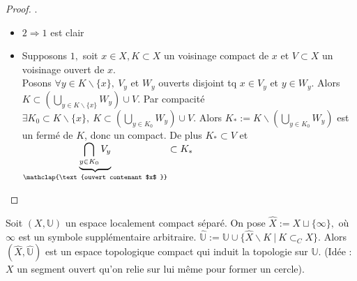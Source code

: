 \begin{proof}.
    \begin{itemize}
        \item $2\Rightarrow 1$ est clair
        \item Supposons $1,$ soit $x\in X,K\subset X$ un voisinage compact de $x$ et $V\subset X$ un voisinage ouvert de $x.$ \\
            Posons $\forall y\in K\backslash \{x\} ,\ V_y $ et $W_y$ ouverts disjoint tq $x\in V_y$ et $y\in W_y.$ Alors $K\subset \left( \bigcup\limits_{y\in K\backslash \{x\} }W_y  \right)\cup V $. Par compacité $\exists K_0\subset K\backslash \{x\} ,\ K\subset \left( \bigcup\limits_{y\in K_0} W_y \right) \cup V.$ Alors $K_*:=K\backslash \left( \bigcup\limits_{y\in K_0} W_y \right) $ est un fermé de $K$, donc un compact. De plus $K_*\subset V$ et $\underbrace{\bigcap\limits_{y\in K_0} V_y}_{\mathclap{\text{ouvert contenant $x$ }}}\subset K_*$
    \end{itemize}
\end{proof}
\begin{definition}
    Soit $(X,\mathbb{U})$ un espace localement compact séparé. On pose $\hat{X}:=X\sqcup \{\infty \} ,$ où $\infty $ est un symbole supplémentaire arbitraire. $\hat{\mathbb{U}}:=\mathbb{U}\cup \{\hat{X}\backslash K\ |\ K\subset _CX\}  $. Alors $(\hat{X},\hat{\mathbb{U}})$ est un espace topologique compact qui induit la topologie sur $\mathbb{U}.$ (Idée : $X$ un segment ouvert qu'on relie sur lui même pour former un cercle).
\end{definition}
